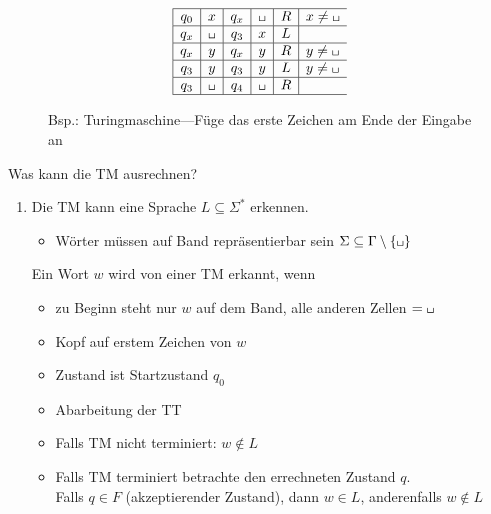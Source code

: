 {\begin{samepage}
\begin{Bsp*}
\begin{figure}[H]
\begin{center}
			\\[2ex]
                        \begin{displaymath}
                          \begin{array}{|c|c|c|c|c|l}
                            \hline
			  	q_0 &  x & q_x & \blank & R  & x\ne\blank\\\hline
                                q_x & \blank & q_3 & x & L\\\hline
                                q_x & y & q_x & y & R & y \ne \blank \\\hline
                                q_3 & y & q_3 & y & L & y \ne \blank\\\hline
                                q_3 & \blank & q_4 & \blank & R\\\hline
                          \end{array}
                        \end{displaymath}
                        \end{center}
			\caption{Bsp.: Turingmaschine---Füge das erste
                        Zeichen am Ende der Eingabe an}
		\end{figure}
	\end{Bsp*}
\end{samepage}
%
Was kann die \ac{TM} ausrechnen?
\begin{enumerate}
	\item Die \ac{TM} kann eine Sprache $L\subseteq\Sigma^*$ erkennen.
	\begin{itemize}
		\item Wörter müssen auf Band repräsentierbar sein $\Sigma\subseteq\Gamma\setminus\{\blank\}$
	\end{itemize}
	Ein Wort $w$ wird von einer \ac{TM} erkannt, wenn
	\begin{itemize}
		\item zu Beginn steht nur $w$ auf dem Band, alle anderen Zellen $=\blank$
		\item Kopf auf erstem Zeichen von $w$
		\item Zustand ist Startzustand $q_0$
		\item Abarbeitung der \ac{TT}
		\item Falls \ac{TM} nicht terminiert: $w\notin L$
		\item Falls \ac{TM} terminiert betrachte den errechneten Zustand $q$.\\
		Falls $q\in F$ (akzeptierender Zustand), dann $w\in L$, anderenfalls $w\notin L$
	\end{itemize}
	

\end{enumerate}}
